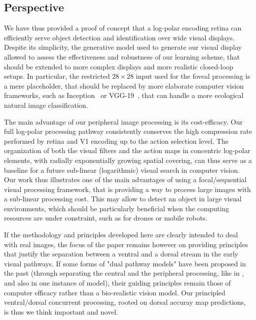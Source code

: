 \subsection{Perspective}

We have thus provided a proof of concept that a log-polar encoding retina can efficiently serve object detection and identification over wide visual displays. Despite its simplicity, the generative model used to generate our visual display allowed to assess the effectiveness and robustness of our learning scheme, that should be extended to more complex displays and more realistic closed-loop setups.
In particular, the restricted $28\times28$ input used for the foveal processing is a mere placeholder, that should be replaced by more elaborate computer vision frameworks, such as Inception~\cite{szegedy2015going} or VGG-19~\cite{simonyan2014very}, that can handle a more ecological natural image classification. 

The main advantage of our peripheral image processing is its cost-efficacy. Our full log-polar processing pathway consistently conserves the high compression rate performed by retina and V1 encoding up to the action selection level. The organization of both the visual filters and the action maps in concentric log-polar elements, with radially exponentially growing spatial covering, can thus serve as a baseline for a future sub-linear (logarithmic) visual search in computer vision. Our work thus illustrates one of the main advantages of using a focal/sequential visual processing framework, that is providing a way to process large images with a sub-linear processing cost. 
This may allow to detect an object in large visual environments, which should be particularly beneficial when the computing resources are under constraint, such as for drones or mobile robots. 


If the methodology and principles developed here are clearly intended to deal with real images, the focus of the paper remains however on providing principles that  justify the separation between a ventral and a dorsal stream in the early visual pathways. If some forms of "dual pathway models" have been proposed in the past (through separating the central and the peripheral processing, like in \cite{denil2012learning}, and also in one instance of \cite{akbas2017object} model), their guiding principles remain those of computer efficacy rather than a bio-realistic vision model. Our principled ventral/dorsal concurrent processing, rooted on dorsal accuray map predictions, is thus we think important and novel.

